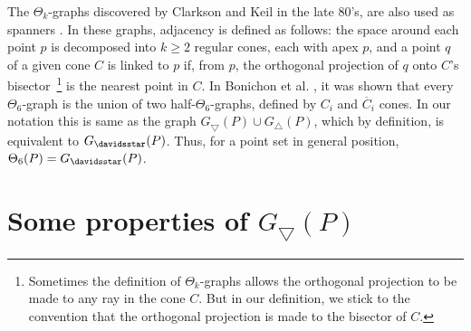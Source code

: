 The $\Theta_k$-graphs discovered by Clarkson \cite{Clarkson1987} and Keil \cite{Keil1988} in the late 80's, are also used as 
spanners \cite{Narasimhan2007}. In these graphs, adjacency is defined as follows: the space around
each point $p$ is decomposed into $k \geqslant 2$ regular cones, each with apex $p$, and a point $q$ of a
given cone $C$ is linked to $p$ if, from $p$, the orthogonal projection of $q$ onto $C$'s bisector~\footnote{Sometimes the definition of 
$\Theta_k$-graphs allows the orthogonal projection to be made to any ray in the cone $C$. But in our definition, we stick to the convention 
that the orthogonal projection is made to the bisector of $C$.} is the nearest point in $C$. In Bonichon et al. \cite{Bonichon2010}, it was shown 
that every $\Theta_6$-graph is the union of two half-$\Theta_6$-graphs, defined by $C_i$ and $\overline{C}_i$ cones. In our notation this is same 
as the graph $G_\bigtriangledown(P) \cup G_\bigtriangleup(P)$, which by definition, is equivalent to $G_{\davidsstar}(P)$. Thus, for a point set 
in general position, $\Theta_6(P) = G_{\davidsstar}(P)$. 
\section{Some properties of $G_\bigtriangledown(P)$}
